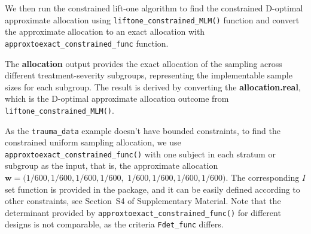 We then run the constrained lift-one algorithm to find the constrained D-optimal approximate allocation using \texttt{liftone\_constrained\_MLM()} function and convert the approximate allocation to an exact allocation with \texttt{approxtoexact\_constrained\_func} function.

The \textbf{allocation} output provides the exact allocation of the sampling across different treatment-severity subgroups, representing the implementable sample sizes for each subgroup. The result is derived by converting the \textbf{allocation.real}, which is the D-optimal approximate allocation outcome from \texttt{liftone\_constrained\_MLM()}.

As the \texttt{trauma\_data} example doesn't have bounded constraints,  to find the constrained uniform sampling allocation, we use \texttt{approxtoexact\_constrained\_func()} with one subject in each stratum or subgroup as the input, that is, the approximate allocation $\mathbf w = (1/600, 1/600, 1/600, 1/600,$ $1/600, 1/600, 1/600, 1/600)$. The corresponding $I$ set function is provided in the  package, and it can be easily defined according to other constraints, see Section~S4 of Supplementary Material. Note that the determinant provided by \texttt{approxtoexact\_constrained\_func()} for different designs is not comparable, as the criteria \texttt{Fdet\_func} differs.


